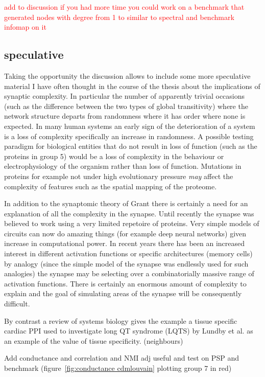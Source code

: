  \textcolor{red}{add to discussion if you had more time you could work on a benchmark that generated nodes with degree from 1 to similar to spectral and benchmark infomap on it}


\subsection{speculative}
Taking the opportunity the discussion allows to include some more speculative material I have often thought in the course of the thesis about the implications of synaptic complexity. In particular the number of apparently trivial occasions (such as the difference between the two types of global transitivity) where the network structure departs from randomness where it has order where none is expected. In many human systems \cite{henriques2020nonlinear}\cite{robertson2015time}\cite{mullan2018habit} an early sign of the deterioration of a system is a loss of complexity specifically an increase in randomness. A possible testing paradigm for biological entities that do not result in loss of function (such as the proteins in group 5) would be a loss of complexity in the behaviour or electrophysiology of the organism rather than loss of function. Mutations in proteins for example not under high evolutionary pressure \textit{may} affect the complexity of features such as the spatial mapping of the proteome\cite{grant2019synapse}. 

 In addition to the synaptomic theory of Grant there is certainly a need for an explanation of all the complexity in the synapse. Until recently the synapse was believed to work using a very limited repetoire of proteins.  Very simple models of circuits can now do amazing things (for example deep neural networks) given increase in computational power. In recent years there has been an increased interest in different activation functions or specific architectures (memory cells) by analogy (since the simple model of the synapse was endlessly used for such analogies) the synapse may be selecting over a combinatorially massive range of activation functions. There is certainly an enormous amount of complexity to explain and the goal of simulating areas of the synapse will be consequently difficult. 
 

By contrast a review of systems biology \cite{parikshak2015systems} gives the example a tissue specific cardiac PPI used to investigate long QT syndrome (LQTS) by Lundby et al.\cite{lundby2014annotation} as an example of the value of tissue specificity. (neighbours)


Add conductance and correlation and NMI adj useful and test on PSP and benchmark
(figure~\ref{fig:conductance cdmlouvain} plotting group 7 in red)

